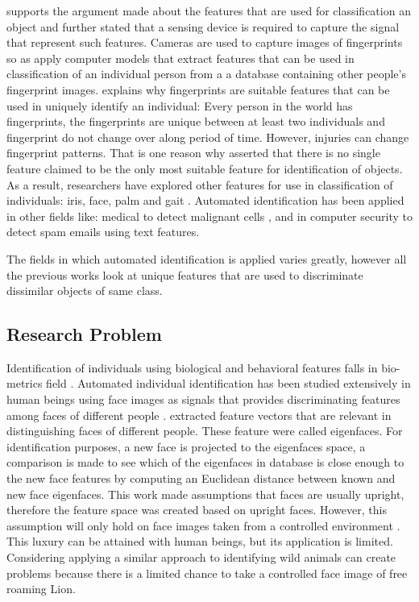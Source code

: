  \citeauthor{duda2012pattern} \citeyear{duda2012pattern} \cite{duda2012pattern} supports the argument made about the features that are used for classification an object and further stated that a sensing device is required to capture the signal that represent such features. Cameras are used to capture images of fingerprints so as apply computer models that extract features that can be used in classification of an individual person from a a database containing other people's fingerprint images. \citeauthor{maltoni2009handbook} \citeyear{maltoni2009handbook} \cite{maltoni2009handbook} explains why fingerprints are suitable features that can be used in uniquely identify an individual: Every person in the world has fingerprints, the fingerprints are unique between at least two individuals and fingerprint do not change over along period of time. However, injuries can change fingerprint patterns. That is one reason why \citeauthor{jain2004introduction} \citeyear{jain2004introduction} \cite{jain2004introduction} asserted that there is no single feature claimed to be the only most suitable feature for identification of objects. As a result, researchers have explored other features for use in classification of individuals: iris, face, palm and gait \cite{jain2007handbook}.     
 Automated identification has been applied in other fields like: medical to detect malignant cells \cite{khan2019novel,esteva2017dermatologist}, and in computer security to detect spam emails \cite{faris2019intelligent} using text features.
 
The fields in which automated identification is applied varies greatly, however all the previous works look at unique features that are used to discriminate dissimilar objects of same class.    

\subsection{Research Problem} 

Identification of individuals using biological and behavioral features falls in bio-metrics field \cite{jain2004introduction}. Automated individual identification has been studied extensively in human beings using face images as signals that provides discriminating features among faces of different people \cite{turk1991face}. \citeauthor{turk1991face}  \citeyear{turk1991face} \cite{turk1991face} extracted feature vectors that are relevant in distinguishing faces of different people. These feature were called eigenfaces. For identification purposes, a new face is projected to the eigenfaces space, a comparison is made to see which of the eigenfaces in database is close enough to the new face features by computing an Euclidean distance between known and new face eigenfaces. This work made assumptions that faces are usually upright, therefore the feature space was created based on upright faces. However, this assumption will only hold on face images taken from a controlled environment \cite{huang2008labeled}. This luxury can be attained with human beings, but its application is limited. Considering applying a similar approach to identifying wild animals can create problems because there is a limited chance to take a controlled face image of free roaming Lion.      

